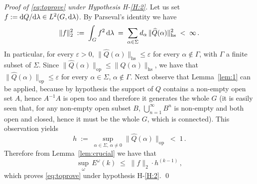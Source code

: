 \documentclass[a4paper,reqno,11pt]{amsart}
\numberwithin{equation}{section}
\newcommand{\ga}{\alpha}
\newcommand{\gep}{\varepsilon}       %
\newcommand{\gl}{\lambda}
\newcommand{\go}{\omega}
\newcommand{\dd}{\text{\rm d}}             %
\DeclareMathOperator*{\union}{\bigcup}       %
\newcommand{\somb}{\widehat} %
\begin{document}
\noindent
{\it Proof of \eqref{eq:toprove} under
Hypothesis H-\ref{H:2}.}
Let us set $f := \dd Q/\dd \gl \in L^2(G, \dd\gl)$.
By Parseval's identity we have
\begin{equation}
\| f \|^2_2 \;:=\; \int_G f^2 \, \dd \gl \;=\; \sum_{\ga \in \Sigma} d_\ga \,
\|\somb Q(\alpha) \|_{\text{hs}}^{2} \;<\; \infty \,.
\end{equation}
In particular, for every $\gep > 0$,
$\|\somb Q(\alpha) \|_{\text{hs}} \le \gep$ for every $\ga \notin  \Gamma$,
with $\Gamma$ a finite subset of $\Sigma$.
 Since
$\|\somb Q(\alpha) \|_{\text{op}} \le \|\somb Q(\alpha) \|_{\text{hs}}$,
we have that $\|\somb Q(\alpha) \|_{\text{op}} \le \gep$ for every
$\ga \in \Sigma$, $\ga \not \in \Gamma$.
Next observe that Lemma~\ref{lem:1} can be applied, because
by hypothesis the support of $Q$ contains a non-empty open set $A$, hence
$A^{-1}A$ is open too and therefore it generates the whole $G$
(it is easily seen that, for any non-empty open subset $B$,
$\union_{n=1}^\infty B^n$ is non-empty and both open and closed,
hence it must be the whole $G$, which is connected).
This observation yields
\begin{equation}
\label{eq:h}
	h \;:=\; \sup_{\ga \in \Sigma, \, \ga \ne 0} \|\somb Q(\alpha) \|_{\text{op}}
	\;<\; 1\,.
\end{equation}
Therefore from Lemma~\ref{lem:crucial} we have that
\begin{equation}
	\sup_\go \, E^\go(k) \;\le\; \|f\|_2 \cdot h^{(k-1)}\,,
\end{equation}
which proves \eqref{eq:toprove} under hypothesis H-\ref{H:2}.
\qed

\smallskip
\end{document}
